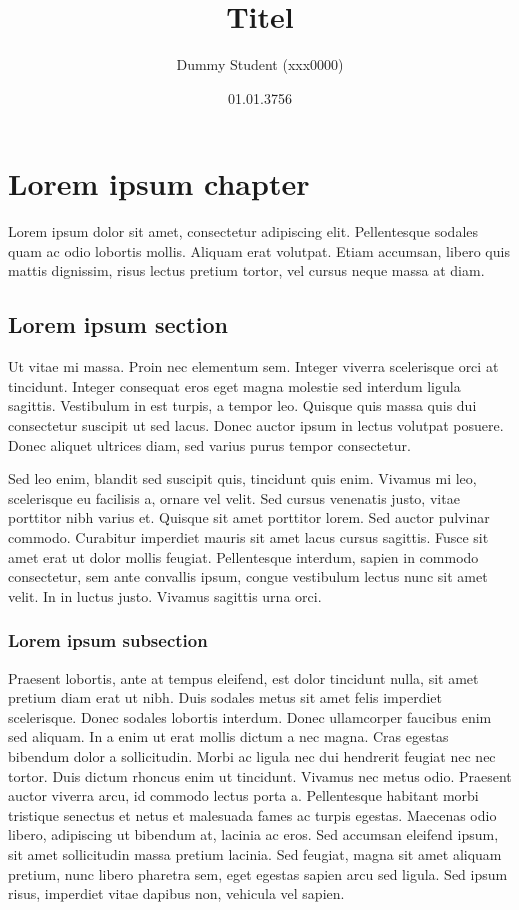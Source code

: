 \documentclass[a4paper,parskip=half,oneside]{scrbook}
\begin{document}
\title{Titel}
\author{Dummy Student (xxx0000)}
\date{01.01.3756}

\maketitle
\thispagestyle{empty}
\clearpage
\newpage

\tableofcontents
\newpage


\chapter{Lorem ipsum chapter} 
Lorem ipsum dolor sit amet, consectetur adipiscing elit.
Pellentesque sodales quam ac odio lobortis mollis. Aliquam erat volutpat.
Etiam accumsan, libero quis mattis dignissim, risus lectus pretium tortor, vel
cursus neque massa at diam. 

\section{Lorem ipsum section} Ut vitae mi massa. Proin nec elementum sem.
Integer viverra scelerisque orci at tincidunt. Integer consequat eros eget magna molestie sed interdum
ligula sagittis. Vestibulum in est turpis, a tempor leo. Quisque quis massa quis dui consectetur
suscipit ut sed lacus. Donec auctor ipsum in lectus volutpat posuere. Donec aliquet ultrices diam,
sed varius purus tempor consectetur.

Sed leo enim, blandit sed suscipit quis, tincidunt quis enim. Vivamus mi leo, scelerisque eu facilisis a,
ornare vel velit. Sed cursus venenatis justo, vitae porttitor nibh varius et. Quisque sit amet porttitor lorem.
Sed auctor pulvinar commodo. Curabitur imperdiet mauris sit amet lacus cursus sagittis. Fusce sit amet erat ut
dolor mollis feugiat. Pellentesque interdum, sapien in commodo consectetur, sem ante convallis ipsum, congue
vestibulum lectus nunc sit amet velit. 
In in luctus justo. Vivamus sagittis urna orci. 

\subsection{Lorem ipsum subsection} Praesent lobortis, 
ante at tempus eleifend, est dolor tincidunt nulla,
sit amet pretium diam erat ut nibh. Duis sodales metus sit amet felis
imperdiet scelerisque. Donec sodales lobortis interdum. Donec ullamcorper
faucibus enim sed aliquam. In a enim ut erat mollis dictum a nec magna.
Cras egestas bibendum dolor a sollicitudin. Morbi ac ligula nec dui hendrerit
feugiat nec nec tortor. Duis dictum rhoncus enim ut tincidunt. Vivamus nec
metus odio. Praesent auctor viverra arcu, id commodo lectus porta a.
Pellentesque habitant morbi tristique senectus et netus et malesuada fames
ac turpis egestas. Maecenas odio libero, adipiscing ut bibendum at,
lacinia ac eros. Sed accumsan eleifend ipsum, sit amet sollicitudin
massa pretium lacinia. Sed feugiat, magna sit amet aliquam pretium, nunc
libero pharetra sem, eget egestas sapien arcu sed ligula. Sed ipsum risus,
imperdiet vitae dapibus non, vehicula vel sapien.
\end{document}
